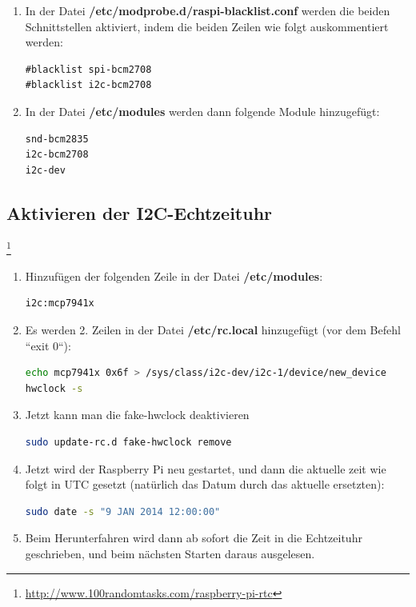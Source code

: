 \documentclass[a4paper,10pt]{article}
\newcommand{\path}[1]{\textcolor{pathcolor}{\textbf{#1}}} %
\begin{document}
\begin{enumerate}
 \item In der Datei \path{/etc/modprobe.d/raspi-blacklist.conf} werden die beiden Schnittstellen aktiviert, indem die beiden Zeilen wie folgt auskommentiert werden:
    \begin{lstlisting}
#blacklist spi-bcm2708
#blacklist i2c-bcm2708
    \end{lstlisting}
 \item In der Datei \path{/etc/modules} werden dann folgende Module hinzugefügt:
    \begin{lstlisting}
snd-bcm2835
i2c-bcm2708 
i2c-dev     
    \end{lstlisting}
\end{enumerate}

\subsection{Aktivieren der I2C-Echtzeituhr}
\let\thefootnote\relax\footnote{\url{http://www.100randomtasks.com/raspberry-pi-rtc}}

\begin{enumerate}
 \item Hinzufügen der folgenden Zeile in der Datei \path{/etc/modules}:
    \begin{lstlisting}
i2c:mcp7941x
    \end{lstlisting}
 \item Es werden 2. Zeilen in der Datei \path{/etc/rc.local} hinzugefügt (vor dem Befehl ``exit 0``):
    \begin{lstlisting}[language=sh]
echo mcp7941x 0x6f > /sys/class/i2c-dev/i2c-1/device/new_device 
hwclock -s
    \end{lstlisting}
 \item Jetzt kann man die fake-hwclock deaktivieren
    \begin{lstlisting}[language=sh]
sudo update-rc.d fake-hwclock remove
    \end{lstlisting}
 \item Jetzt wird der Raspberry Pi neu gestartet, und dann die aktuelle zeit wie folgt in UTC gesetzt (natürlich das Datum durch das aktuelle ersetzten): 
    \begin{lstlisting}[language=sh]
sudo date -s "9 JAN 2014 12:00:00"
    \end{lstlisting}
 \item Beim Herunterfahren wird dann ab sofort die Zeit in die Echtzeituhr geschrieben, und beim nächsten Starten daraus ausgelesen.
\end{enumerate}
\end{document}
